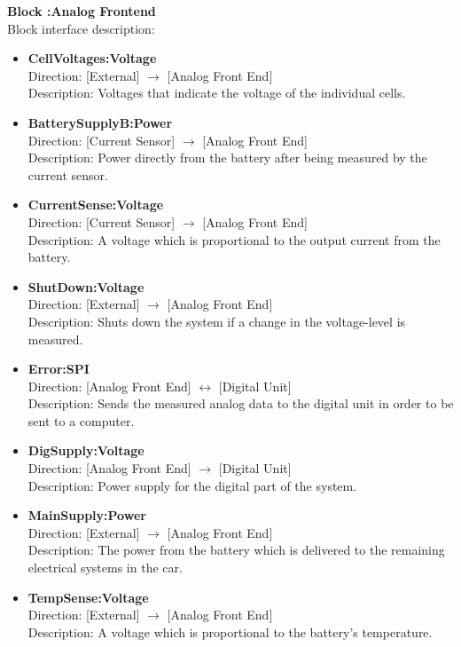 \textbf{Block :Analog Frontend}\\
Block interface description:
\begin{itemize}
	\item \textbf{CellVoltages:Voltage}\\
	Direction: [External] $\rightarrow$ [Analog Front End]\\
	Description: Voltages that indicate the voltage of the individual cells.
	\item \textbf{BatterySupplyB:Power}\\
	Direction: [Current Sensor] $\rightarrow$ [Analog Front End]\\
	Description: Power directly from the battery after being measured by the current sensor.
	\item \textbf{CurrentSense:Voltage}\\
	Direction: [Current Sensor] $\rightarrow$ [Analog Front End]\\
	Description: A voltage which is proportional to the output current from the battery.
	\item \textbf{ShutDown:Voltage}\\
	Direction: [External] $\rightarrow$ [Analog Front End]\\
	Description: Shuts down the system if a change in the voltage-level is measured.
	\item \textbf{Error:SPI}\\
	Direction: [Analog Front End] $\leftrightarrow$ [Digital Unit]\\
	Description: Sends the measured analog data to the digital unit in order to be sent to a computer.
	\item \textbf{DigSupply:Voltage}\\
	Direction: [Analog Front End] $\rightarrow$ [Digital Unit]\\
	Description: Power supply for the digital part of the system.
	\item \textbf{MainSupply:Power}\\
	Direction: [External] $\rightarrow$ [Analog Front End]\\
	Description: The power from the battery which is delivered to the remaining electrical systems in the car.
	\item \textbf{TempSense:Voltage}\\
	Direction: [External] $\rightarrow$ [Analog Front End]\\
	Description: A voltage which is proportional to the battery's temperature.
\end{itemize}


